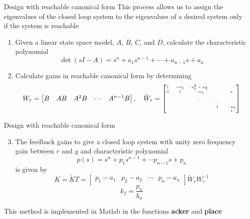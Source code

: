 \documentclass[10pt]{beamer-control}
\begin{document}
\begin{frame}{Design with reachable canonical form}
This process allows us to assign the eigenvalues of the closed loop system to the eigenvalues of a desired system only if the system is reachable
\begin{enumerate}
	\item Given a linear state space model, $A$, $B$, $C$, and $D$, calculate the characteristic polynomial
	\begin{equation}
		\operatorname{det}(sI-A) = s^n+a_1s^{n-1}+\cdots + a_{n-1}s+a_n
	\end{equation}
	\item Calculate gains in reachable canonical form  
	by determining  \begin{equation}
		W_r = \begin{bmatrix}
			B & AB & A^2 B & \cdots & A^{n-1}B
		\end{bmatrix},\quad \tiny{\tilde{W}_r = \begin{bmatrix}
			1 & -a_1 & a_1^2-a_2 & & \\
			0 & 1 & -a_1 & & * \\
			& & \ddots & \ddots & \\
			&  & & 1 & -a_1 \\
			& & & & 1
		\end{bmatrix}}
	\end{equation}
\end{enumerate}
\end{frame}

\begin{frame}{Design with reachable canonical form}
\begin{enumerate}
	\setcounter{enumi}{2}
	\item The feedback gains to give a closed loop system with unity zero frequency gain between $r$ and $y$ and characteristic polynomial
	\begin{equation}
		p(s) = s^n+p_1 s^{n-1}+ \cdots p_{n-1}s+p_n
	\end{equation}
	is given by 
	\begin{equation}
		K=\tilde{K}T = \begin{bmatrix}
			p_1-a_1 & p_2-a_2 & \cdots & p_n-a_n
		\end{bmatrix} \tilde{W}_r W_r^{-1}
	\end{equation}
	\begin{equation}
		k_f = \frac{p_n}{b_n}
	\end{equation}
\end{enumerate}
This method is implemented in Matlab in the functions \textbf{acker} and \textbf{place}
\end{frame}
\end{document}
